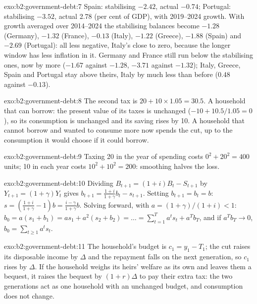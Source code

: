 \begin{solution}{exo:b2:government-debt:7}
Spain: stabilising $-2.42$, actual $-0.74$; Portugal: stabilising $-3.52$, actual 2.78 (per cent of GDP), with 2019--2024 growth. With growth averaged over 2014--2024 the
stabilising balances become $-1.28$ (Germany), $-1.32$ (France), $-0.13$ (Italy), $-1.22$ (Greece), $-1.88$ (Spain) and $-2.69$ (Portugal): all less negative, Italy's close to zero, because the
longer window has less inflation in it. Germany and France still run  below the stabilising ones, now by more ($-1.67$ against $-1.28$, $-3.71$ against
$-1.32$); Italy, Greece, Spain and Portugal stay above theirs, Italy by much less than before (0.48 against $-0.13$).
\end{solution}

\begin{solution}{exo:b2:government-debt:8}
The second tax is $20 + 10 \times 1.05 = 30.5$. A household that can borrow: the present value of its taxes is unchanged ($-10 + 10.5/1.05 = 0$), so its consumption is
unchanged and its saving rises by 10. A household that cannot borrow and wanted to consume more now spends the cut, up to
the consumption it would choose if it could borrow.
\end{solution}

\begin{solution}{exo:b2:government-debt:9}
Taxing 20 in the year of spending costs $0^2 + 20^2 = 400$ units; 10 in each year costs $10^2 + 10^2 = 200$: smoothing halves the loss.
\end{solution}

\begin{solution}{exo:b2:government-debt:10}
Dividing $B_{t+1} = (1 + i)B_t - S_{t+1}$ by $Y_{t+1} = (1 + \gamma)Y_t$ gives $b_{t+1} = \frac{1 + i}{1 + \gamma}b_t - s_{t+1}$. Setting $b_{t+1} = b_t = b$: $s = \left(\frac{1 + i}{1 + \gamma} - 1\right)b = \frac{i - \gamma}{1 + \gamma}b$. Solving forward, with $a = (1 + \gamma)/(1 + i) < 1$:
$b_0 = a(s_1 + b_1) = as_1 + a^2(s_2 + b_2) = \dots = \sum_{t=1}^T a^ts_t + a^Tb_T$, and if $a^Tb_T \to 0$, $b_0 = \sum_{t \ge 1} a^ts_t$.
\end{solution}

\begin{solution}{exo:b2:government-debt:11}
The household's budget is $c_1 = y_1 - T_1$; the cut raises its disposable income by $\Delta$ and the repayment falls on the next generation, so $c_1$ rises by $\Delta$. If the household
weighs its heirs' welfare as its own and leaves them a bequest, it raises the bequest by $(1 + r)\Delta$ to pay their extra tax: the two
generations act as one household with an unchanged budget, and consumption does not change.
\end{solution}

